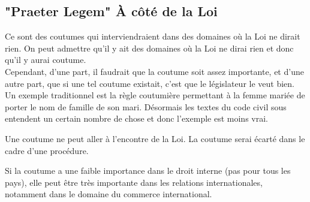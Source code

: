 \documentclass[12pt, a4paper, openany]{book}
\begin{document}
\subsection{"Praeter Legem" À côté de la Loi}

Ce sont des coutumes qui interviendraient dans des domaines où la Loi ne dirait rien. On peut admettre qu'il y ait des domaines où la Loi ne dirai rien et donc qu'il y aurai coutume. \\
Cependant, d'une part, il faudrait que la coutume soit assez importante, et d'une autre part, que si une tel coutume existait, c'est que le législateur le veut bien. \\
Un exemple traditionnel est la règle coutumière permettant à la femme mariée de porter le nom de famille de son mari. Désormais les textes du code civil sous entendent un certain nombre de chose et donc l'exemple est moins vrai.


Une coutume ne peut aller à l'encontre de la Loi. La coutume serai écarté dans le cadre d'une procédure.


Si la coutume a une faible importance dans le droit interne (pas pour tous les pays), elle peut être très importante dans les relations internationales, notamment dans le domaine du commerce international.

\end{document}
